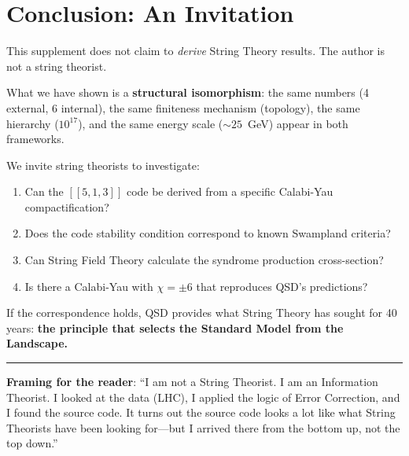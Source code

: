 \documentclass[11pt,a4paper]{article}
\theoremstyle{definition}
\begin{document}
\section{Conclusion: An Invitation}
\label{sec:conclusion}

This supplement does not claim to \emph{derive} String Theory results. The author is not a string theorist.

What we have shown is a \textbf{structural isomorphism}: the same numbers (4 external, 6 internal), the same finiteness mechanism (topology), the same hierarchy ($10^{17}$), and the same energy scale ($\sim 25$~GeV) appear in both frameworks.

We invite string theorists to investigate:
\begin{enumerate}
    \item Can the $[[5,1,3]]$ code be derived from a specific Calabi-Yau compactification?
    \item Does the code stability condition correspond to known Swampland criteria?
    \item Can String Field Theory calculate the syndrome production cross-section?
    \item Is there a Calabi-Yau with $\chi = \pm 6$ that reproduces QSD's predictions?
\end{enumerate}

If the correspondence holds, QSD provides what String Theory has sought for 40 years: \textbf{the principle that selects the Standard Model from the Landscape.}

\vspace{1em}
\hrule
\vspace{1em}

\textbf{Framing for the reader}: ``I am not a String Theorist. I am an Information Theorist. I looked at the data (LHC), I applied the logic of Error Correction, and I found the source code. It turns out the source code looks a lot like what String Theorists have been looking for---but I arrived there from the bottom up, not the top down.''
\end{document}
